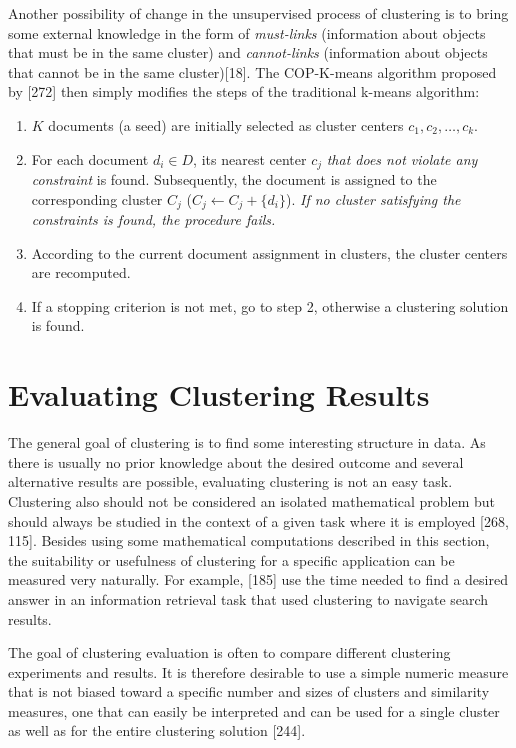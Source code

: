 \documentclass[11pt,openany,executivepaper]{book}
\begin{document}
Another possibility of change in the unsupervised process of clustering is to bring some external knowledge in the form of \textit{must-links} (information about objects that must be in the same cluster) and \textit{cannot-links} (information about objects that cannot be in the same cluster)[18]. The COP-K-means algorithm proposed by [272] then simply modifies the steps of the traditional k-means algorithm:

\begin{enumerate}
    \item $K$ documents (a seed) are initially selected as cluster centers $c_1, c_2, \ldots, c_k$.
    
    \item For each document $d_i \in D$, its nearest center $c_j$ \textit{that does not violate any constraint} is found. Subsequently, the document is assigned to the corresponding cluster $C_j$ ($C_j \leftarrow C_j + \{d_i\}$). \textit{If no cluster satisfying the constraints is found, the procedure fails.}
    
    \item According to the current document assignment in clusters, the cluster centers are recomputed.
    
    \item If a stopping criterion is not met, go to step 2, otherwise a clustering solution is found.
\end{enumerate}

\section{Evaluating Clustering Results}
The general goal of clustering is to find some interesting structure in data. As there is usually no prior knowledge about the desired outcome and several alternative results are possible, evaluating clustering is not an easy task. Clustering also should not be considered an isolated mathematical problem but should always be studied in the context of a given task where it is employed [268, 115]. Besides using some mathematical computations described in this section, the suitability or usefulness of clustering for a specific application can be measured
very naturally. For example, [185] use the time needed to find a desired answer in an information retrieval task that used clustering to navigate search results.

The goal of clustering evaluation is often to compare different clustering experiments and results. It is therefore desirable to use a simple numeric measure that is not biased toward a specific number and sizes of clusters and similarity measures, one that can easily be interpreted and can be used for a single cluster as well as for the entire clustering solution [244].
\end{document}
